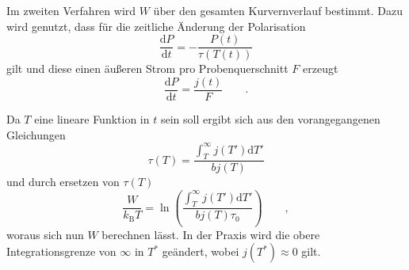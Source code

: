 Im zweiten Verfahren wird $W$ über den gesamten Kurvernverlauf bestimmt.
Dazu wird genutzt, dass für die zeitliche Änderung der Polarisation
\begin{equation*}
    \frac{\mathrm{d}P}{\mathrm{d}t} = - \frac{ P(t) }{ \tau(T(t))}
\end{equation*}
gilt und diese einen äußeren Strom pro Probenquerschnitt $F$ erzeugt
\begin{equation*}
    \frac{\mathrm{d}P}{\mathrm{d}t} = \frac{j(t)}{F} \qquad.
\end{equation*}

Da $T$ eine lineare Funktion in $t$ sein soll ergibt sich aus den vorangegangenen Gleichungen
\begin{equation*}
    \tau(T) = \frac{ \int_{T}^\infty j(T') \mathrm{d}T' }{ b j(T) } 
\end{equation*}
und durch ersetzen von $\tau(T)$ 
\begin{equation}
    \label{eqn:integrate}
     \frac{ W }{ k_\mathrm{B} T } = \ln{ \left( \frac{ \int_{T}^\infty j(T') \mathrm{d}T' }{ b j(T) \tau_0 } \right) } \qquad ,
\end{equation}
woraus sich nun $W$ berechnen lässt.
In der Praxis wird die obere Integrationsgrenze von $\infty$ in $T^*$ geändert, wobei $j(T^*) \approx 0$ gilt.
